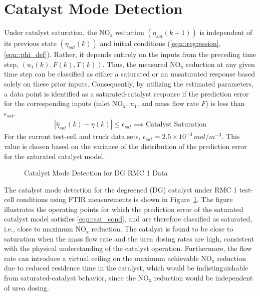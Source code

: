 \documentclass[subscriptcorrection,upint,varvw,barcolor=Goldenrod3,mathalfa=cal=euler,balance,hyphenate,french,pdf-a]{asmejour}
\newcommand{\lr}[1]{\left( #1 \right)}
\newcommand{\abs}[1]{\left\lvert #1 \right\rvert}
\newcommand{\figWidth}{0.45\textwidth}
\newcommand{\nox}{\text{NO}_{\text{x}}}
\begin{document}
\section{Catalyst Mode Detection}
Under catalyst saturation, the $\nox$ reduction $\lr{\eta_{sat}(k+1)}$ is independent of its previous state
$\lr{\eta_{sat}(k)}$ and initial conditions (\ref{eqn::regression}, \ref{eqn::phi_def}). Rather, it depends entirely on
the inputs from the preceding time step, $\lr{u_1(k), F(k), T(k)}$. Thus, the measured $\nox$ reduction at any given
time step can be classified as either a saturated or an unsaturated response based solely on these prior inputs.
Consequently, by utilizing the estimated parameters, a data point is identified as a saturated-catalyst response if the
prediction error for the corresponding inputs (inlet $\nox$, $u_1$, and mass flow rate $F$) is less than $\epsilon_{sat}$.
\begin{align}
    \abs{\hat \eta_{sat}(k) - \eta(k)} \leq \epsilon_{sat} \implies \text{Catalyst Saturation} \label{eqn::sat_cond}
\end{align}
For the current test-cell and truck data sets, $\epsilon_{sat} = 2.5\times 10^{-3} \, mol/m^{-3}$. This value is chosen
based on the variance of the distribution of the prediction error for the saturated catalyst model.
\begin{figure}[H]
    \centering
    \caption{Catalyst Mode Detection for DG RMC 1 Data}
    \label{fig::cat_mode_det}
\end{figure}
The catalyst mode detection for the degreened (DG) catalyst under RMC 1 test-cell conditions using FTIR measurements is shown in
Figure~\ref{fig::cat_mode_det}. The figure illustrates the operating points for which the prediction error of the
saturated catalyst model satisfies \eqref{eqn::sat_cond}, and are therefore classified as saturated, i.e., close to
maximum $\nox$ reduction. The catalyst is found to be close to saturation when the mass flow rate and the urea dosing
rates are high, consistent with the physical understanding of the catalyst operation. Furthermore, the flow rate can
introduce a virtual ceiling on the maximum achievable $\nox$ reduction due to reduced residence time in the catalyst,
which would be indistinguishable from saturated-catalyst behavior, since the $\nox$ reduction would be independent of
urea dosing.
\end{document}
